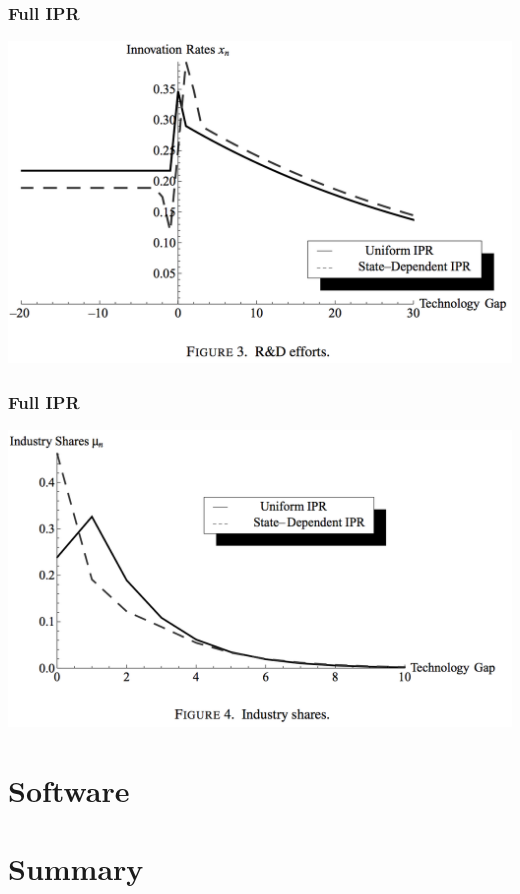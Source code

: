 \documentclass{beamer}
\begin{document}
\begin{frame}[t]\frametitle{Full IPR} 
  \begin{center}
    \includegraphics[scale=.28]{full_ipr_rnd.png}
    \label{fig:full_ipr_rnd}
  \end{center}
\end{frame}

\begin{frame}[t]\frametitle{Full IPR} 
  \begin{center}
    \includegraphics[scale=.28]{full_ipr_distbn.png}
    \label{fig:full_ipr_distbn}
  \end{center}
\end{frame}


\section{Software}
\label{sec:software}

\section{Summary}
\label{sec:summary}
\end{document}
